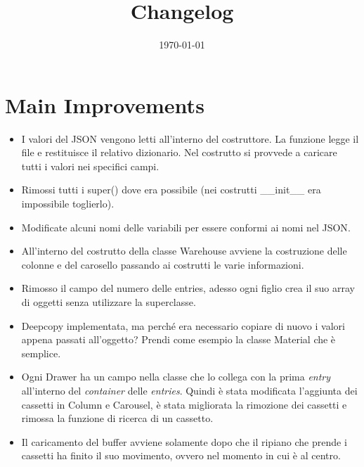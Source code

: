 \documentclass[a4paper]{article}
\begin{document}
	\title{Changelog}
	\date{\today}
	\maketitle
	
	\newpage
	
	\section*{Main Improvements}
	
	\begin{itemize}[label=]
		\item I valori del \textsf{JSON} vengono letti all'interno del costruttore. La funzione legge il file e restituisce il relativo dizionario. Nel costrutto si provvede a caricare tutti i valori nei specifici campi.
		
		\item Rimossi tutti i \textsf{super()} dove era possibile (nei costrutti \textsf{\_\_init\_\_} era impossibile toglierlo).
		
		\item Modificate alcuni nomi delle variabili per essere conformi ai nomi nel \textsf{JSON}.
		
		\item All'interno del costrutto della classe \textsf{Warehouse} avviene la costruzione delle colonne e del carosello passando ai costrutti le varie informazioni.
		
		\item Rimosso il campo del numero delle entries, adesso ogni figlio crea il suo array di oggetti senza utilizzare la superclasse.
		
		\item \textsf{Deepcopy} implementata, ma perché era necessario copiare di nuovo i valori appena passati all'oggetto? Prendi come esempio la classe \textsf{Material} che è semplice.
		
		\item Ogni \textsf{Drawer} ha un campo nella classe che lo collega con la prima \emph{entry} all'interno del \emph{container} delle \emph{entries}. Quindi è stata modificata l'aggiunta dei cassetti in \textsf{Column} e \textsf{Carousel}, è stata migliorata la rimozione dei cassetti e rimossa la funzione di ricerca di un cassetto.
		
		\item Il caricamento del \textsf{buffer} avviene solamente dopo che il ripiano che prende i cassetti ha finito il suo movimento, ovvero nel momento in cui è al centro.
	\end{itemize}
\end{document}

